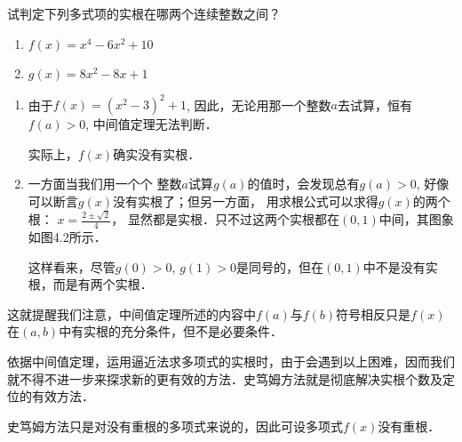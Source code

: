 \begin{example}
   试判定下列多式项的实根在哪两个连续整数之间？
\begin{multicols}{2}
 \begin{enumerate}
     \item $f (x) =x^4-6x^2+10$
     \item $g(x)=8x^2-8x+1$
 \end{enumerate}
\end{multicols}
\end{example}

\begin{solution}
\begin{enumerate}
    \item 由于$f(x)=(x^2-3)^2+1$, 因此，无论用那一个整数$a$去试算，恒有$f(a)>0$, 中间值定理无法判断．
    
    实际上，$f(x)$确实没有实根．
    \item 一方面当我们用一个个
    整数$a$试算$g(a)$的值时，会发现总有$g(a)>0$, 好像可以断言$g(x)$没有实根了；但另一方面，
    用求根公式可以求得$g(x)$的两个根：
    $x=\frac{2\pm\sqrt{2}}{4}$，
    显然都是实根．只不过这两个实根都在$(0, 1)$中间，其图象如图4.2所示．

    这样看来，尽管$g(0)>0$, $g(1)>0$是同号的，但在$(0, 1)$中不是没有实根，而是有两个实根．
\end{enumerate}

\begin{figure}[htp]
    \centering
{}
    \caption{}
\end{figure}
\end{solution}

这就提醒我们注意，中间值定理所述的内容中$f(a)$与$f(b)$符号相反只是$f(x)$在$(a,b)$中有实根的充分条件，但不是必要条件．
    
    依据中间值定理，运用逼近法求多项式的实根时，由于会遇到以上困难，因而我们就不得不进一步来探求新的更有效的方法．史笃姆方法就是彻底解决实根个数及定位的有效方法．
    
    史笃姆方法只是对没有重根的多项式来说的，因此可设多项式$f(x)$没有重根．

